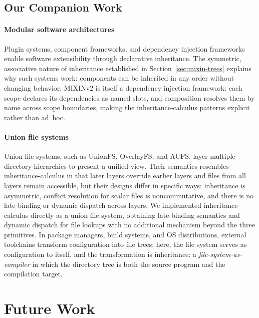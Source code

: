 \subsection{Our Companion Work}

\paragraph{Modular software architectures}
\label{sec:practical-modular}
Plugin systems, component frameworks, and dependency injection frameworks
enable software extensibility through declarative inheritance. The
symmetric, associative nature of inheritance established in Section~\ref{sec:mixin-trees} explains why such
systems work: components can be inherited in any order without changing
behavior.
MIXINv2
is itself a dependency injection framework:
each scope declares its dependencies as named slots, and
composition resolves them by name across scope boundaries,
making the inheritance-calculus patterns explicit rather than ad~hoc.

\paragraph{Union file systems}
\label{sec:practical-union-fs}
Union file systems, such as UnionFS, OverlayFS, and AUFS, layer multiple directory
hierarchies to present a unified view. Their semantics resembles
inheritance-calculus in that later layers override earlier layers and files from all
layers remain accessible, but their designs differ in specific ways:
inheritance is asymmetric, conflict resolution for scalar files
is noncommutative, and there is no late-binding or dynamic
dispatch across layers.
We implemented inheritance-calculus directly as a union file
system,
obtaining late-binding semantics and dynamic dispatch for file lookups
with no additional mechanism beyond the three primitives.
In package managers, build systems, and OS distributions,
external toolchains transform configuration into file trees;
here, the file system serves as configuration to itself,
and the transformation is inheritance: a
\emph{file-system-as-compiler} in which the directory tree is
both the source program and the compilation target.

\section{Future Work}
\label{sec:future-work}

